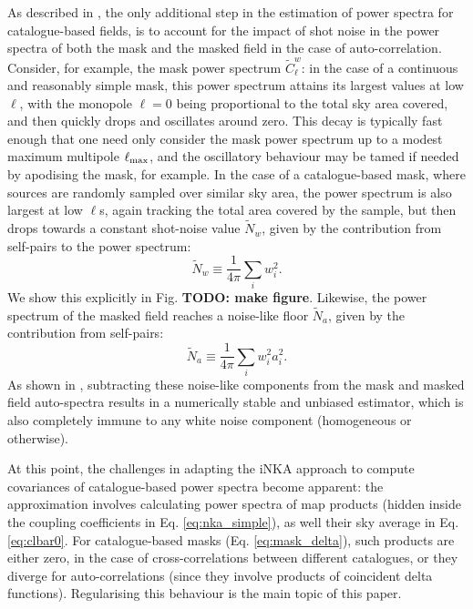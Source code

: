 \documentclass[aps,twocolumn, superscriptaddress, english, nofootinbib, 10pt]{revtex4-2}
\newcommand{\todo}[1]{{\color{blue}\bf TODO: #1}}
\begin{document}
    As described in \cite{2407.21013}, the only additional step in the estimation of power spectra for catalogue-based fields, is to account for the impact of shot noise in the power spectra of both the mask and the masked field in the case of auto-correlation. Consider, for example, the mask power spectrum $\tilde{C}_\ell^w$: in the case of a continuous and reasonably simple mask, this power spectrum attains its largest values at low $\ell$, with the monopole $\ell=0$ being proportional to the total sky area covered, and then quickly drops and oscillates around zero. This decay is typically fast enough that one need only consider the mask power spectrum up to a modest maximum multipole $\ell_{\rm max}$, and the oscillatory behaviour may be tamed if needed by apodising the mask, for example. In the case of a catalogue-based mask, where sources are randomly sampled over similar sky area, the power spectrum is also largest at low $\ell$s, again tracking the total area covered by the sample, but then drops towards a constant shot-noise value $\tilde{N}_w$, given by the contribution from self-pairs to the power spectrum:
    \begin{equation}\label{eq:Nw}
      \tilde{N}_w\equiv\frac{1}{4\pi}\sum_iw_i^2.
    \end{equation}
    We show this explicitly in Fig. \todo{make figure}. Likewise, the power spectrum of the masked field reaches a noise-like floor $\tilde{N}_a$, given by the contribution from self-pairs:
    \begin{equation}\label{eq:Na}
      \tilde{N}_a\equiv\frac{1}{4\pi}\sum_iw_i^2a_i^2.
    \end{equation}
    As shown in \cite{2407.21013}, subtracting these noise-like components from the mask and masked field auto-spectra results in a numerically stable and unbiased estimator, which is also completely immune to any white noise component (homogeneous or otherwise).

    At this point, the challenges in adapting the iNKA approach to compute covariances of catalogue-based power spectra become apparent: the approximation involves calculating power spectra of map products (hidden inside the coupling coefficients in Eq. \ref{eq:nka_simple}), as well their sky average in Eq. \ref{eq:clbar0}. For catalogue-based masks (Eq. \ref{eq:mask_delta}), such products are either zero, in the case of cross-correlations between different catalogues, or they diverge for auto-correlations (since they involve products of coincident delta functions). Regularising this behaviour is the main topic of this paper.
\end{document}
